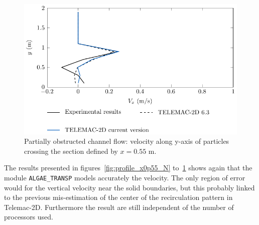 \begin{figure}[h!]%
\begin{center}
%
  \includegraphics[]{./Figures/CanalAlgProfile_x0p55_Vy}
%
\end{center}
\caption
{Partially obstructed channel flow: velocity along y-axis of particles crossing the section defined by $x=0.55$ m.}
\label{fig:profile_x0p55_V_Y}
\end{figure}

The results presented in figures~\ref{fig:profile_x0p55_N} to~\ref{fig:profile_x0p55_V_Y} shows again that the module
\texttt{ALGAE\_TRANSP} models accurately the velocity. The only region of error would for the vertical velocity near
the solid boundaries, but this probably linked to the previous mis-estimation of the center of the recirculation
pattern in Telemac-2D. Furthermore the result are still independent of the number of processors used.

